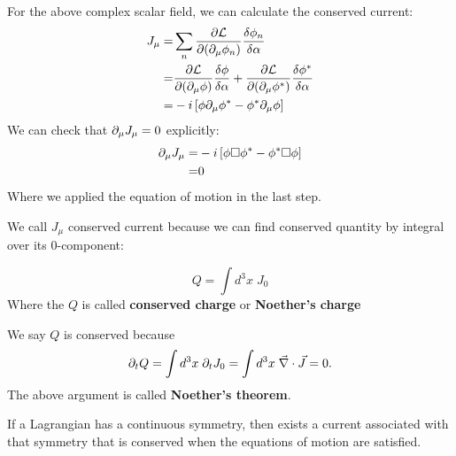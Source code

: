 \documentclass[../QFTCS_note.tex]{subfiles}
\numberwithin{equation}{subsection}
\begin{document}
\begin{example}
  For the above complex scalar field, we can calculate the conserved current:
  \bigskip
  \begin{align*}
    J_{\mu}= & \sum_n\frac{\partial \mathcal{L}}{\partial(\partial_\mu \phi_n)}\frac{\delta\phi_n}{\delta \alpha} \\
    =        & \frac{\partial \mathcal{L}}{\partial(\partial_\mu \phi)}\frac{\delta\phi}{\delta \alpha}
    +\frac{\partial \mathcal{L}}{\partial(\partial_\mu \phi^*)}\frac{\delta\phi^*}{\delta \alpha}                 \\
    =        & -i\left[\phi\partial_\mu\phi^*-\phi^* \partial_\mu\phi\right]
  \end{align*}
  We can check that \(\partial_\mu J_{\mu}=0\) explicitly:
  \begin{align*}
    \partial_\mu J_{\mu}= & -i\left[\phi\square\phi^*-\phi^* \square\phi\right] \\
    =               & 0
  \end{align*}
  Where we applied the equation of motion in the last step.
\end{example}
We call \(J_\mu\) conserved current because we can find conserved quantity by integral over its 0-component:
\begin{definition}
  \[Q=\int d^3x\;J_0\]
  Where the \(Q\) is called \textbf{conserved charge} or \textbf{Noether's charge}
\end{definition}
We say \(Q\) is conserved because
\begin{equation}
  \partial_tQ=\int d^3x \; \partial_t J_0 = \int d^3x\;\vec{\nabla}\cdot \vec{J} = 0.
\end{equation}
The above argument is called \textbf{Noether's theorem}.
\begin{theorem}
  If a Lagrangian has a continuous symmetry,
  then exists a current associated with that symmetry that is
  conserved when the equations of motion are satisfied.
\end{theorem}
\end{document}
